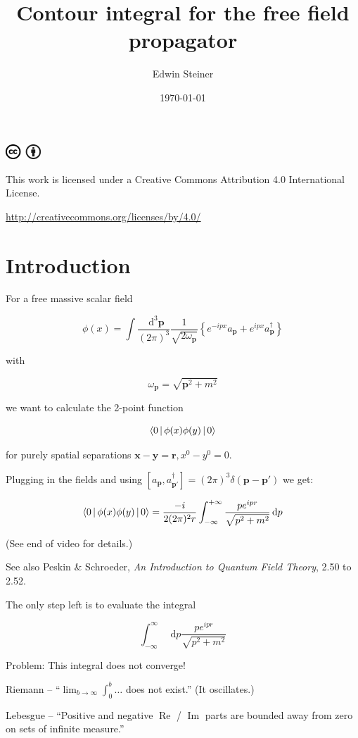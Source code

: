 \documentclass[aspectratio=169]{beamer}
\title{Contour integral for the free field propagator}
\author{Edwin Steiner}
\date{\today}
\newcommand{\sqrtpm}{\sqrt{p^2 + m^2}}
\newcommand{\integrand}{\frac{p e^{ipr}}{\sqrt{p^2 + m^2}}}
\newcommand{\vp}{\mathbf{p}}
\newcommand{\vx}{\mathbf{x}}
\newcommand{\vy}{\mathbf{y}}
\newcommand{\vr}{\mathbf{r}}
\newcommand{\vpp}{\mathbf{p}'}
\newcommand{\omvp}{\omega_{\vp}}
\newcommand{\ap}{a_{\vp}}
\newcommand{\adp}{a^\dagger_{\vp}}
\newcommand{\adpp}{a^\dagger_{\vpp}}
\newcommand{\diffop}{\mathop{}\!\mathrm{d}}
\newcommand{\dip}{\diffop p}
\newcommand{\intpthree}{\int \frac{\diffop^3\vp}{(2\pi)^3}}
\newcommand{\com}[2]{[{#1},{#2}]}
\newcommand{\phixy}{\Braket{0|\phi(x)\phi(y)|0}}
\newcommand{\intii}{\int_{-\infty}^{+\infty}}
\renewcommand\Re{\operatorname{Re}}
\renewcommand\Im{\operatorname{Im}}
\begin{document}

\begin{frame}
\titlepage
\begin{tiny}
\includegraphics[width=0.1\textwidth]{CC_BY.png}

\medskip
This work is licensed under a Creative Commons Attribution 4.0 International License.

\url{http://creativecommons.org/licenses/by/4.0/}
\end{tiny}
\end{frame}


\section{Introduction}


\begin{frame}
For a free massive \alert{scalar field}

\pause
$$\phi(x) = \intpthree \frac{1}{\sqrt{2\omvp}} \left\{ e^{-ipx} \ap + e^{ipx} \adp \right\}$$

with

$$\omvp = \sqrt{\vp^2 + m^2}$$

\pause
we want to calculate the \alert{2-point function}

\pause
$$\phixy$$

\pause
\medskip
for \alert{purely spatial} separations $\vx - \vy = \vr, x^0 - y^0 = 0$.
\end{frame}


\begin{frame}
Plugging in the fields and using $\com{\ap}{\adpp} = (2\pi)^3 \delta(\vp - \vpp)$ we get:

\pause
$$\phixy = \frac{-i}{2(2\pi)^2 r} \intii \frac{p e^{ipr}}{\sqrtpm} \dip$$

\pause
\bigskip
(See end of video for details.)

\pause
\medskip
See also Peskin \& Schroeder, \textit{An Introduction to Quantum Field Theory}, 2.50 to 2.52.
\end{frame}


\begin{frame}
The only step left is to evaluate the integral

$$\int_{-\infty}^{\infty} \dip \integrand$$

\pause
\medskip
Problem: \alert{This integral does not converge!}

\pause
\bigskip
Riemann -- ``$\lim_{b \to \infty} \int_0^b \ldots$ does not exist.'' (It oscillates.)

\pause
\bigskip
Lebesgue -- ``Positive and negative $\Re$ / $\Im$ parts are bounded away from zero on sets of infinite measure.''
\end{frame}
\end{document}
